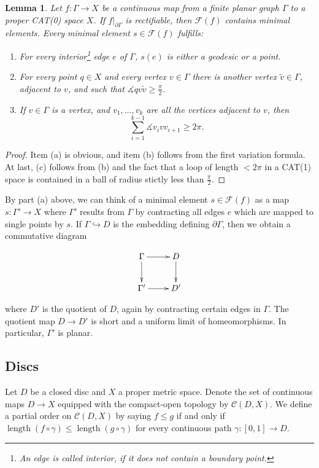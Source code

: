 \documentclass[a4paper,12pt]{article}
\newtheorem{lemma}{Lemma}
\theoremstyle{remark}\newtheorem*{remark}{Remark}
\theoremstyle{definition}\newtheorem{definition}{Definition}
\newcommand{\len}{\operatorname{length}}
\begin{document}
\begin{lemma}\label{lem:graphs}
Let $f:\Gamma\rightarrow X$ be a continuous map from a finite planar graph $\Gamma$ to 
a proper CAT(0) space $X$. If $f|_{\partial\Gamma}$ is rectifiable, then 
$\mathcal{F}(f)$ contains minimal elements. Every minimal element $s\in\mathcal{F}(f)$ fulfills:
\begin{enumerate}
 \item[(a)] For every interior\footnote{An edge is called {\em interior},
 if it does not contain a boundary point.} edge $e$ of $\Gamma$, $s(e)$ is either a geodesic
 or a point.
 \item[(b)] For every point $q\in X$ and every vertex $v\in\Gamma$ there is another vertex $\tilde v\in\Gamma$,
 adjacent to $v$, and such that $\measuredangle q v\tilde v\geq \tfrac\pi2$.
 \item[(c)] If $v\in\Gamma$ is a vertex, and $v_1,\ldots,v_k$ are all the vertices adjacent to $v$, then
 $$
 \sum_{i=1}^{k-1} \measuredangle v_i v v_{i+1}\geq 2\pi.
 $$
\end{enumerate}

\end{lemma}


\begin{proof}
 Item (a) is obvious, and item (b) follows from the first variation formula. At last, (c)
 follows from (b) and the fact that a loop of length $<2\pi$ in a CAT(1) space is contained in 
 a ball of radius stictly less than $\tfrac\pi2$.
\end{proof}

By part (a) above, we can think of a minimal element $s\in\mathcal{F}(f)$ as a map
$s:\Gamma'\rightarrow X$ where $\Gamma'$ results from $\Gamma$ by contracting all edges
$e$ which are mapped to single points by $s$. If $\Gamma\hookrightarrow D$ is the embedding
defining $\partial \Gamma$, then we obtain a commutative diagram

\begin{displaymath}
    \xymatrix{ \Gamma \ar[r]\ar[d] & D \ar[d] \\
               \Gamma' \ar[r] & D'  }
\end{displaymath}

where $D'$ is the quotient of $D$, again by contracting certain edges in $\Gamma$. The quotient map
$D\rightarrow D'$ is short and a uniform limit of homeomorphisms. In particular, $\Gamma'$ is planar.

  
\subsection{Discs}
Let $D$ be a closed disc and $X$ a proper metric space. Denote the set
of continuous maps $D\to X$ equipped with the compact-open topology 
by $\mathcal{C}(D,X)$. We define a partial 
order on $\mathcal{C}(D,X)$ by saying $f\leq g$ if and only if
$\len(f\circ\gamma)\leq \len(g\circ\gamma)$ for every continuous path
$\gamma:[0,1]\to D$.
\end{document}
